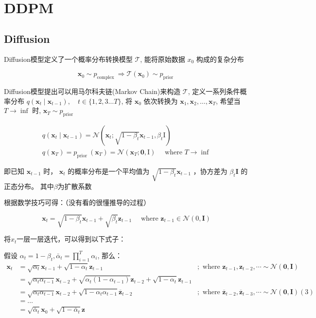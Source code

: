 \documentclass[]{ctexart}
\begin{document}
\section{DDPM}
\subsection{Diffusion}

Diffusion模型定义了一个概率分布转换模型 $\mathcal{T}$, 能将原始数据 $x_0$ 构成的复杂分布

$$
\mathbf{x}_0 \sim p_{\text {complex }} \Longrightarrow \mathcal{T}\left(\mathbf{x}_0\right) \sim p_{\text {prior }}
$$

Diffusion模型提出可以用马尔科夫链(Markov Chain)来构造 $\mathcal{T}$, 定义一系列条件概率分布 $q\left(\mathbf{x}_t \mid \mathbf{x}_{t-1}\right), \quad t \in\{1,2,3 \ldots T\}$, 
将 $\mathbf{x}_0$ 依次转换为 $\mathbf{x}_1, \mathbf{x}_2, \ldots, \mathbf{x}_T$, 希望当 $T \rightarrow \inf$ 时, $\mathbf{x}_T \sim p_{\text {prior }}$

$$
\begin{gathered}
q\left(\mathbf{x}_t \mid \mathbf{x}_{t-1}\right)=\mathcal{N}\left(\mathbf{x}_t ; \sqrt{1-\beta_t} \mathbf{x}_{t-1}, \beta_t \mathrm{I}\right) \\
q\left(\mathbf{x}_T\right)=p_{\text {prior }}\left(\mathbf{x}_T\right)=\mathcal{N}\left(\mathbf{x}_T ; \mathbf{0}, \mathrm{I}\right) \quad \text { where } T \rightarrow \inf
\end{gathered}
$$

即已知 $\mathbf{x}_{t-1}$ 时， $\mathbf{x}_t$ 的概率分布是一个平均值为 $\sqrt{1-\beta_t} \mathbf{x}_{t-1}$ ，协方差为 $\beta_t \mathbf{I}$ 的正态分布。
其中$\beta$为扩散系数

根据数学技巧可得：（没有看的很懂推导的过程）

$$
\mathbf{x}_t=\sqrt{1-\beta_t} \mathbf{x}_{t-1}+\sqrt{\beta_t} \mathbf{z}_{t-1} \quad \text { where } \mathbf{z}_{t-1} \in \mathcal{N}(0, \mathbf{I})
$$

将$x_t$一层一层迭代，可以得到以下式子：

假设 $\alpha_t=1-\beta_t, \bar{\alpha}_t=\prod_{i=1}^T \alpha_i$, 那么：
$$
\begin{array}{rlr}
\mathbf{x}_t & =\sqrt{\alpha_t} \mathbf{x}_{t-1}+\sqrt{1-\alpha_t} \mathbf{z}_{t-1} & ; \text { where } \mathbf{z}_{t-1}, \mathbf{z}_{t-2}, \cdots \sim \mathcal{N}(\mathbf{0}, \mathbf{I}) \\
& =\sqrt{\alpha_t \alpha_{t-1}} \mathbf{x}_{t-2}+\sqrt{\alpha_t\left(1-\alpha_{t-1}\right)} \mathbf{z}_{t-2}+\sqrt{1-\alpha_t} \mathbf{z}_{t-1} & \\
& =\sqrt{\alpha_t \alpha_{t-1}} \mathbf{x}_{t-2}+\sqrt{1-\alpha_t \alpha_{t-1}} \overline{\mathbf{z}}_{t-2} & ; \text { where } \overline{\mathbf{z}}_{t-2}, \overline{\mathbf{z}}_{t-3}, \cdots \sim \mathcal{N}(\mathbf{0}, \mathbf{I})(3) \\
& =\ldots & \\
& =\sqrt{\bar{\alpha}_t} \mathbf{x}_0+\sqrt{1-\bar{\alpha}_t} \mathbf{z} &
\end{array}
$$
\end{document}
